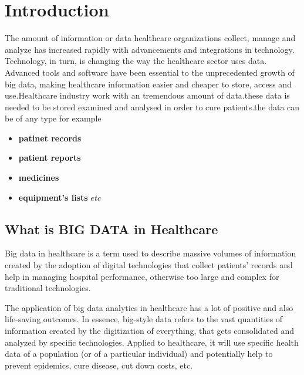 \documentclass[12pt]{article}
\begin{document}
\section{Introduction}
The amount of information or data  healthcare organizations collect, manage and analyze has increased rapidly with advancements and integrations in technology. Technology, in turn, is changing the way the healthcare sector uses data. Advanced tools and software have been essential to the unprecedented growth of big data, making healthcare information easier and cheaper to store, access and use.Healthcare industry work with an tremendous amount of data.these data is needed to be stored examined and analysed in order to cure patients.the data can be of any type for example
\begin{itemize}
    \item \textbf{patinet records}
    \item \textbf{patient reports}
    \item \textbf{medicines}
    \item \textbf{equipment's lists} $etc$
\end{itemize}

\subsection{What is BIG DATA in Healthcare}
Big data in healthcare is a term used to describe massive volumes of information created by the adoption of digital technologies that collect patients' records and help in managing hospital performance, otherwise too large and complex for traditional technologies.

The application of big data analytics in healthcare has a lot of positive and also life-saving outcomes. In essence, big-style data refers to the vast quantities of information created by the digitization of everything, that gets consolidated and analyzed by specific technologies. Applied to healthcare, it will use specific health data of a population (or of a particular individual) and potentially help to prevent epidemics, cure disease, cut down costs, etc.
\end{document}
